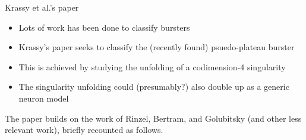 \documentclass[,aspectratio=169]{beamer}
\begin{document}
\begin{frame}[label={sec:org5183e6a}]{Krassy et al.'s paper}
\begin{itemize}
\item Lots of work has been done to classify bursters
\item Krassy's paper seeks to classify the (recently found) psuedo-plateau burster
\item This is achieved by studying the unfolding of a codimension-4 singularity
\item The singularity unfolding could (presumably?) also double up as a generic neuron model
\end{itemize}


The paper builds on the work of Rinzel, Bertram, and Golubitsky (and other less relevant work), briefly recounted as follows.
\end{frame}
\end{document}

